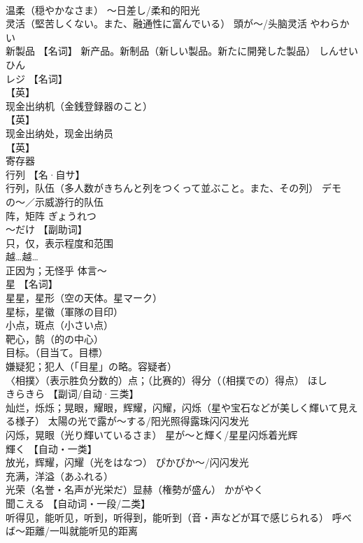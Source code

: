 \documentclass[8pt]{extreport}
\begin{document}
\begin{CJK}{UTF8}{min}
\\	温柔（穏やかなさま） ～日差し/柔和的阳光 
\\	灵活（堅苦しくない。また、融通性に富んでいる） 頭が～/头脑灵活	やわらかい	
\\	新製品	【名词】 新产品。新制品（新しい製品。新たに開発した製品）	しんせいひん	
\\	レジ	【名词】 
\\	【英】
\\	现金出纳机（金銭登録器のこと） 
\\	【英】
\\	现金出纳处，现金出纳员 
\\	【英】
\\	寄存器		
\\	行列	【名·自サ】 
\\	行列，队伍（多人数がきちんと列をつくって並ぶこと。また、その列） デモの〜／示威游行的队伍 
\\	[数]阵，矩阵	ぎょうれつ	
\\	～だけ	【副助词】 
\\	只，仅，表示程度和范围 
\\	越…越… 
\\	正因为；无怪乎 体言～		
\\	星	【名词】 
\\	星星，星形（空の天体。星マーク） 
\\	星标，星徽（軍隊の目印） 
\\	小点，斑点（小さい点） 
\\	靶心，鹄（的の中心） 
\\	目标。（目当て。目標） 
\\	嫌疑犯；犯人（「目星」の略。容疑者） 
\\	〈相撲〉（表示胜负分数的）点；（比赛的）得分（（相撲での）得点）	ほし	
\\	きらきら	【副词/自动·三类】 
\\	灿烂，烁烁；晃眼，耀眼，辉耀，闪耀，闪烁（星や宝石などが美しく輝いて見える様子） 太陽の光で露が～する/阳光照得露珠闪闪发光 
\\	闪烁，晃眼（光り輝いているさま） 星が～と輝く/星星闪烁着光辉		
\\	輝く	【自动・一类】 
\\	放光，辉耀，闪耀（光をはなつ） ぴかぴか〜/闪闪发光 
\\	充满，洋溢（あふれる） 
\\	光荣（名誉・名声が光栄だ）显赫（権勢が盛ん）	かがやく	
\\	聞こえる	【自动词・一段/二类】 
\\	听得见，能听见，听到，听得到，能听到（音・声などが耳で感じられる） 呼べば〜距離/一叫就能听见的距离 

\end{CJK}
\end{document}
